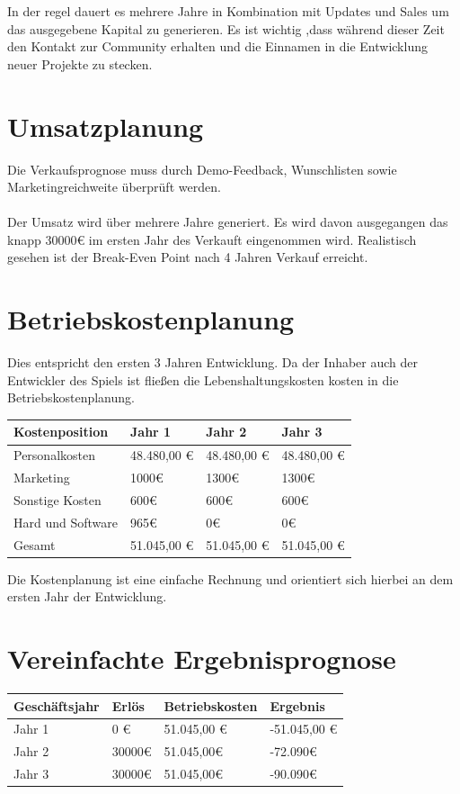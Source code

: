 \documentclass[envcountsame,envcountchap deutsch]{i-studis}
\begin{document}
In der regel dauert es mehrere Jahre in Kombination mit Updates und Sales um das ausgegebene Kapital zu generieren. Es ist wichtig ,dass während dieser Zeit den Kontakt zur Community erhalten und die Einnamen in die Entwicklung neuer Projekte zu stecken.

\section{Umsatzplanung}
Die Verkaufsprognose muss durch Demo-Feedback, Wunschlisten sowie Marketingreichweite überprüft werden. 
\\
\\
Der Umsatz wird über mehrere Jahre generiert. Es wird davon ausgegangen das knapp 30000€ im ersten Jahr des Verkauft eingenommen wird. Realistisch gesehen ist der Break-Even Point nach 4 Jahren Verkauf erreicht.
\section{Betriebskostenplanung}
Dies entspricht den ersten 3 Jahren Entwicklung.
Da der Inhaber auch der Entwickler des Spiels ist fließen die Lebenshaltungskosten kosten in die Betriebskostenplanung.
\begin{table}[ht]
	\centering
	\begin{tabular}{|p{5cm}|p{3cm}|p{3cm}|p{3cm}|}
		\hline
		\textbf{Kostenposition}  & \textbf{Jahr 1} & \textbf{Jahr 2} & \textbf{Jahr 3}\\ \hline
		Personalkosten  & 48.480,00 €& 48.480,00 €& 48.480,00 € \\ \hline
		Marketing & 1000€ & 1300€ & 1300€ \\ \hline
		Sonstige Kosten & 600€ & 600€ & 600€ \\ \hline
		Hard und Software  &965€ & 0€ & 0€ \\ \hline
		Gesamt  &51.045,00 € &51.045,00 € & 51.045,00 € \\ \hline
	\end{tabular}
\end{table}

Die Kostenplanung ist eine einfache Rechnung und orientiert sich hierbei an dem ersten Jahr der Entwicklung.


\section{Vereinfachte Ergebnisprognose}

\begin{table}[ht]
	\centering
	\begin{tabular}{|p{5cm}|p{3cm}|p{3cm}|p{3cm}|}
		\hline
		\textbf{Geschäftsjahr}  & \textbf{Erlös}  &\textbf{ Betriebskosten} & \textbf{Ergebnis}\\ \hline
		Jahr 1  & 0 €& 51.045,00 €& -51.045,00 € \\ \hline
		Jahr 2 & 30000€ & 51.045,00€ & -72.090€ \\ \hline
		Jahr 3  & 30000€ & 51.045,00€ &-90.090€ \\ \hline
	\end{tabular}
\end{table}
\end{document}
